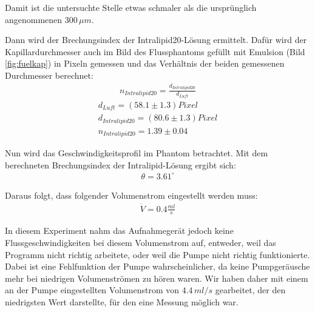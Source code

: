 \documentclass[german, %
parskip=full, %
bibliography=totoc, %
]{scrartcl}
\begin{document}
Damit ist die untersuchte Stelle etwas schmaler als die ursprünglich angenommenen $300\, \mu m$.

Dann wird der Brechungsindex der Intralipid20-Lösung ermittelt. Dafür wird der Kapillardurchmesser auch im Bild des Flussphantoms gefüllt mit Emulsion (Bild \ref{fig:fuelkap}) in Pixeln gemessen und das Verhältnis der beiden gemessenen Durchmesser berechnet: 
\begin{align}
n_{Intralipid20} = \frac{d_{Intralipid20}}{d_{Luft}}
\end{align}
\begin{align*}
d_{Luft} = (58.1 \pm 1.3) Pixel \\
d_{Intralipid20} = (80.6 \pm 1.3) Pixel \\
n_{Intralipid20} = 1.39 \pm 0.04
\end{align*}

Nun wird das Geschwindigkeitsprofil im Phantom betrachtet. Mit dem berechneten Brechungsindex der Intralipid-Lösung ergibt sich:
\begin{align*}
\theta = 3.61^\circ
\end{align*}

Daraus folgt, dass folgender Volumenstrom eingestellt werden muss:
\begin{align*}
\dot V = 0.4 \frac{ml}{s}
\end{align*}

In diesem Experiment nahm das Aufnahmegerät jedoch keine Flussgeschwindigkeiten bei diesem Volumenstrom auf, entweder, weil das Programm nicht richtig arbeitete, oder weil die Pumpe nicht richtig funktionierte. Dabei ist eine Fehlfunktion der Pumpe wahrscheinlicher, da keine Pumpgeräusche mehr bei niedrigen Volumenströmen zu hören waren. Wir haben daher mit einem an der Pumpe eingestellten Volumenstrom von $4.4\, ml/s$ gearbeitet, der den niedrigsten Wert darstellte, für den eine Messung möglich war.
\end{document}
